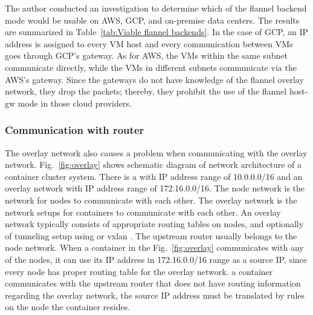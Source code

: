 The author conducted an investigation to determine which of the flannel backend mode would be usable on AWS, GCP, and on-premise data centers.
The results are summarized in Table~\ref{tab:Viable flannel backends}. 
In the case of GCP, an IP address  is assigned to every VM host and every communication between VMs goes through GCP's gateway.
As for AWS, the VMs within the same subnet communicate directly, while the VMs in different subnets communicate via the AWS's gateway.
Since the gateways do not have knowledge of the flannel overlay network, they drop the packets; thereby, 
they prohibit the use of the flannel host-gw mode in those cloud providers.  

\subsubsection{Communication with router}

The overlay network also causes a problem when communicating with  the overlay network.
Fig.~\ref{fig:overlay} shows schematic diagram of network architecture of a container cluster system. 
There is a  with  IP address range of 10.0.0.0/16 and an overlay network with  IP address range of 172.16.0.0/16.
The node network is the network for nodes to communicate with each other.
The overlay network is the network setups for containers to communicate with each other.
An overlay network typically consists of appropriate routing tables on nodes, and optionally of tunneling setup using  \cite{kuznetsov1999tunnels} or vxlan \cite{zismer2016performance}.
The upstream router usually belongs to the node network.
When a container in the Fig.~\ref{fig:overlay} communicates with any of the nodes, it can use its IP address in 172.16.0.0/16 range as a source IP, since every node has proper routing table for the overlay network.
 a container communicates with the upstream router that does not have routing information regarding the overlay network, the source IP address must be translated by  rules on the node  the container resides.

